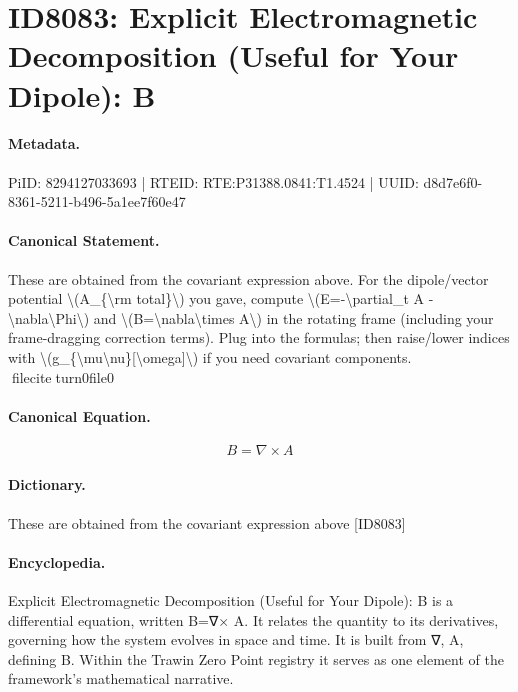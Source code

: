 \section*{ID8083: Explicit Electromagnetic Decomposition (Useful for Your Dipole): B}
\paragraph{Metadata.}
PiID: 8294127033693 | RTEID: RTE:P31388.0841:T1.4524 | UUID: d8d7e6f0-8361-5211-b496-5a1ee7f60e47

\paragraph{Canonical Statement.}
These are obtained from the covariant expression above. For the dipole/vector potential \textbackslash{}(A\_\{\textbackslash{}rm total\}\textbackslash{}) you gave, compute \textbackslash{}(E=-\textbackslash{}partial\_t A - \textbackslash{}nabla\textbackslash{}Phi\textbackslash{}) and \textbackslash{}(B=\textbackslash{}nabla\textbackslash{}times A\textbackslash{}) in the rotating frame (including your frame-dragging correction terms). Plug into the formulas; then raise/lower indices with \textbackslash{}(g\_\{\textbackslash{}mu\textbackslash{}nu\}[\textbackslash{}omega]\textbackslash{}) if you need covariant components. fileciteturn0file0

\paragraph{Canonical Equation.}
\[
B=\nabla\times A
\]

\paragraph{Dictionary.}
These are obtained from the covariant expression above [ID8083]

\paragraph{Encyclopedia.}
Explicit Electromagnetic Decomposition (Useful for Your Dipole): B is a differential equation, written B=∇× A. It relates the quantity to its derivatives, governing how the system evolves in space and time. It is built from ∇, A, defining B. Within the Trawin Zero Point registry it serves as one element of the framework's mathematical narrative.
